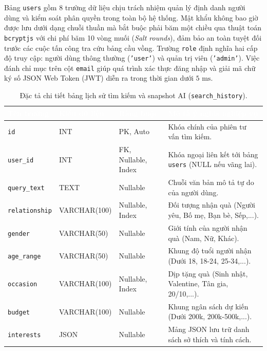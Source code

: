 Bảng \texttt{users} gồm 8 trường dữ liệu chịu trách nhiệm quản lý định danh người dùng và kiểm soát phân quyền trong toàn bộ hệ thống. Mật khẩu không bao giờ được lưu dưới dạng chuỗi thuần mà bắt buộc phải băm một chiều qua thuật toán \texttt{bcryptjs} với chi phí băm 10 vòng muối (\textit{Salt rounds}), đảm bảo an toàn tuyệt đối trước các cuộc tấn công tra cứu bảng cầu vồng. Trường \texttt{role} định nghĩa hai cấp độ truy cập: người dùng thông thường (\texttt{'user'}) và quản trị viên (\texttt{'admin'}). Việc đánh chỉ mục trên cột \texttt{email} giúp quá trình xác thực đăng nhập và giải mã chữ ký số JSON Web Token (JWT) diễn ra trong thời gian dưới $5\text{ ms}$.

\begin{table}[htbp]
\centering
\caption{Đặc tả chi tiết bảng lịch sử tìm kiếm và snapshot AI (\texttt{search\_history}).}
\label{tab:db_history}
\small
\renewcommand{\arraystretch}{1.25}
\begin{tabularx}{\textwidth}{|p{3.0cm}|p{2.6cm}|p{2.8cm}|X|}
\hline
\rowcolor{PrimaryBlue}
\textcolor{white}{\textbf{Tên trường}} &
\textcolor{white}{\textbf{Kiểu dữ liệu}} &
\textcolor{white}{\textbf{Ràng buộc}} &
\textcolor{white}{\textbf{Mô tả ý nghĩa nghiệp vụ}} \\
\hline
\texttt{id} & INT & PK, Auto & Khóa chính của phiên tư vấn tìm kiếm. \\
\hline
\texttt{user\_id} & INT & FK, Nullable, Index & Khóa ngoại liên kết tới bảng \texttt{users} (NULL nếu vãng lai). \\
\hline
\texttt{query\_text} & TEXT & Nullable & Chuỗi văn bản mô tả tự do của người dùng. \\
\hline
\texttt{relationship} & VARCHAR(100) & Nullable, Index & Đối tượng nhận quà (Người yêu, Bố mẹ, Bạn bè, Sếp,...). \\
\hline
\texttt{gender} & VARCHAR(50) & Nullable & Giới tính của người nhận quà (Nam, Nữ, Khác). \\
\hline
\texttt{age\_range} & VARCHAR(50) & Nullable & Khung độ tuổi người nhận (Dưới 18, 18-24, 25-34,...). \\
\hline
\texttt{occasion} & VARCHAR(100) & Nullable, Index & Dịp tặng quà (Sinh nhật, Valentine, Tân gia, 20/10,...). \\
\hline
\texttt{budget} & VARCHAR(100) & Nullable & Khung ngân sách dự kiến (Dưới 200k, 200k-500k,...). \\
\hline
\texttt{interests} & JSON & Nullable & Mảng JSON lưu trữ danh sách sở thích và tính cách. \\

\end{tabularx}
\end{table}
